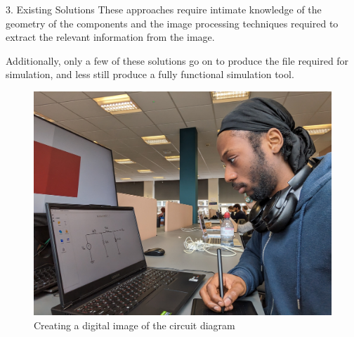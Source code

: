 \documentclass{beamer}
\begin{document}
\begin{frame}[t]
\begin{columns}[t]
\begin{column}{\colwidth}
\begin{block}{3. Existing Solutions}
        These approaches \cite{} require intimate knowledge of the geometry of the components
        and the image processing techniques required to extract the relevant information
        from the image.

        Additionally, only a few of these solutions \cite{} go on to produce the file required
        for simulation, and less still \cite{} produce a fully functional simulation tool.
      \end{block}

      {\beamerblocknoheader
      \vspace*{2ex}
      \begin{block}{}
        \begin{figure}[t]
          \centering
          \includegraphics[keepaspectratio,width=\colwidth,height=40ex]{../common/graphics/demonstration-draw.jpg}
          \caption{Creating a digital image of the circuit diagram}
          \label{key1}
        \end{figure}
      \end{block}
      }

    \end{column}

    \separatorcolumn


\end{columns}
\end{frame}
\end{document}
